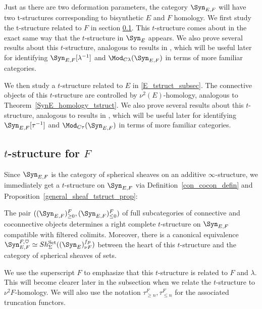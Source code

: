   \bigskip
  
  Just as there are two deformation parameters, the category $\Syn_{E,F}$ will have two t-structures corresponding to bisynthetic $E$ and $F$ homology. We first study the t-structure related to $F$ in section \ref{F_tstruct_subsec}. This $t$-structure comes about in the exact same way that the $t$-structure in $\Syn_E$ appears. We also prove several results about this $t$-structure, analogous to results in \cite{Pst22}, which will be useful later for identifying $\Syn_{E,F}[\lambda^{-1}]$ and $\Mod_{C\lambda}(\Syn_{E,F})$ in terms of more familiar categories.
  
  \bigskip
  
  We then study a $t$-structure related to $E$ in \ref{E_tstruct_subsec}. The connective objects of this $t$-structure are controlled by $\nu^2(E)$-homology, analogous to Theorem~\ref{SynE_homology_tstruct}. We also prove several results about this $t$-structure, analogous to results in \cite{Pst22}, which will be useful later for identifying $\Syn_{E,F}[\tau^{-1}]$ and $\Mod_{C\tau}(\Syn_{E,F})$ in terms of more familiar categories.
  
  \subsection{$t$-structure for $F$}
  \label{F_tstruct_subsec}
  
  Since $\Syn_{E,F}$ is the category of spherical sheaves on an additive $\infty$-structure, we immediately get a $t$-structure on $\Syn_{E,F}$ via Definition~\ref{con_cocon_defin} and Proposition~\ref{general_sheaf_tstruct_prop}:
  
  \begin{proposition}
  \label{F_bisyn_tstruct_prop}
  The pair $((\Syn_{E,F})_{\geq 0}^F,(\Syn_{E,F})_{\leq 0}^F)$ of full subcategories of connective and coconnective objects determines a right
  complete $t$-structure on $\Syn_{E,F}$ compatible with filtered colimits. Moreover, there is a canonical equivalence $\Syn_{E,F}^{F,\heartsuit}\simeq Sh_{\Sigma}^{\mathrm{Set}}((\Syn_E)_{\nu F}^{fp})$ between the heart of this $t$-structure and the category of
  spherical sheaves of sets.  
  \end{proposition}
  
  \begin{remark}
  We use the superscript $F$ to emphasize that this $t$-structure is related to $F$ and $\lambda$. This will become clearer later in the subsection when we relate the $t$-structure to $\nu^2F$-homology. We will also use the notation $\tau_{\geq n}^F, \tau_{\leq n}^F$ for the associated truncation functors.
  \end{remark}
  
